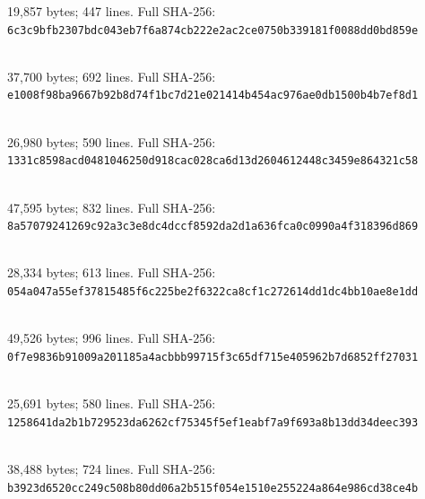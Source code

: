 \documentclass[11pt]{article}
\begin{document}
19,857 bytes; 447 lines. Full SHA-256:\\
\nolinkurl{6c3c9bfb2307bdc043eb7f6a874cb222e2ac2ce0750b339181f0088dd0bd859e}\par\smallskip
\par\noindent{}\\
37,700 bytes; 692 lines. Full SHA-256:\\
\nolinkurl{e1008f98ba9667b92b8d74f1bc7d21e021414b454ac976ae0db1500b4b7ef8d1}\par\smallskip
\par\noindent{}\\
26,980 bytes; 590 lines. Full SHA-256:\\
\nolinkurl{1331c8598acd0481046250d918cac028ca6d13d2604612448c3459e864321c58}\par\smallskip
\par\noindent{}\\
47,595 bytes; 832 lines. Full SHA-256:\\
\nolinkurl{8a57079241269c92a3c3e8dc4dccf8592da2d1a636fca0c0990a4f318396d869}\par\smallskip
\par\noindent{}\\
28,334 bytes; 613 lines. Full SHA-256:\\
\nolinkurl{054a047a55ef37815485f6c225be2f6322ca8cf1c272614dd1dc4bb10ae8e1dd}\par\smallskip
\par\noindent{}\\
49,526 bytes; 996 lines. Full SHA-256:\\
\nolinkurl{0f7e9836b91009a201185a4acbbb99715f3c65df715e405962b7d6852ff27031}\par\smallskip
\par\noindent{}\\
25,691 bytes; 580 lines. Full SHA-256:\\
\nolinkurl{1258641da2b1b729523da6262cf75345f5ef1eabf7a9f693a8b13dd34deec393}\par\smallskip
\par\noindent{}\\
38,488 bytes; 724 lines. Full SHA-256:\\
\nolinkurl{b3923d6520cc249c508b80dd06a2b515f054e1510e255224a864e986cd38ce4b}\par\smallskip
\end{document}
